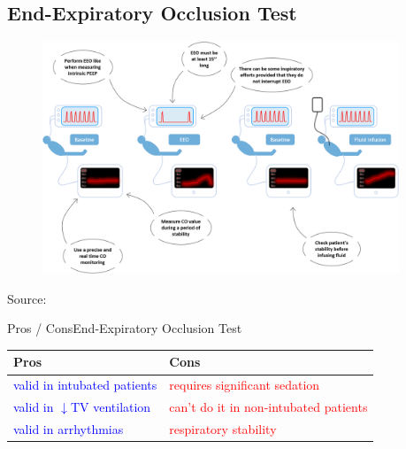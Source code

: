\documentclass{beamer}
\newcommand{\pro}{\textcolor{blue}}
\newcommand{\con}{\textcolor{red}}
\begin{document}
		\subsection{End-Expiratory Occlusion Test}
			\begin{frame}
				\begin{figure}
					\centering
					\includegraphics[width=0.95\textwidth]{figures/eeot}
					\label{fig:eeot}
				\end{figure}
				\tiny Source: \cite{Gavelli2019}
			\end{frame}
			\begin{frame}{Pros / Cons}{End-Expiratory Occlusion Test}
				\begin{center}
					\begin{tabular}{l||l}
						\textbf{Pros} & \textbf{Cons} \\	
						\hline
						\pro{valid in intubated patients} & \con{requires significant sedation}\\
						\hline
						\pro{valid in $\downarrow$TV ventilation} & \con{can't do it in non-intubated patients}\\
						\hline
						\pro{valid in arrhythmias} & \con{respiratory stability}\\
					\end{tabular}
				\end{center}
			\end{frame}
\end{document}
